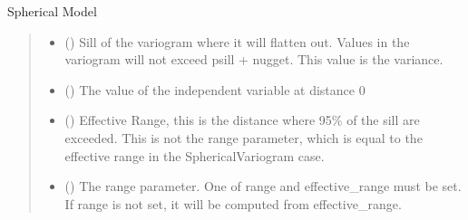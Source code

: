 \documentclass[letterpaper,10pt,english]{sphinxmanual}
\begin{document}

\begin{fulllineitems}
\label{\detokenize{covariance:glomar_gridding.variogram.SphericalVariogram}}
\pysigstartsignatures
\pysiglinewithargsret
{}
{\sphinxparamcomma {}\sphinxparamcomma {}\sphinxparamcomma {}}
{}
\pysigstopsignatures
\sphinxAtStartPar
Spherical Model
\begin{quote}\begin{description}
\begin{itemize}
\item {}
\sphinxAtStartPar
{} (\sphinxstyleliteralemphasis{\sphinxupquote{ | }}) \textendash{} Sill of the variogram where it will flatten out. Values in the variogram
will not exceed psill + nugget. This value is the variance.

\item {}
\sphinxAtStartPar
{} (\sphinxstyleliteralemphasis{\sphinxupquote{ | }}) \textendash{} The value of the independent variable at distance 0

\item {}
\sphinxAtStartPar
{} (\sphinxstyleliteralemphasis{\sphinxupquote{ | }}\sphinxstyleliteralemphasis{\sphinxupquote{ | }}) \textendash{} Effective Range, this is the distance where 95\% of the sill are
exceeded. This is not the range parameter, which is equal to the
effective range in the SphericalVariogram case.

\item {}
\sphinxAtStartPar
{} (\sphinxstyleliteralemphasis{\sphinxupquote{ | }}\sphinxstyleliteralemphasis{\sphinxupquote{ | }}) \textendash{} The range parameter. One of range and effective\_range must be set. If
range is not set, it will be computed from effective\_range.


\end{itemize}
\end{description}
\end{quote}
\end{fulllineitems}
\end{document}
